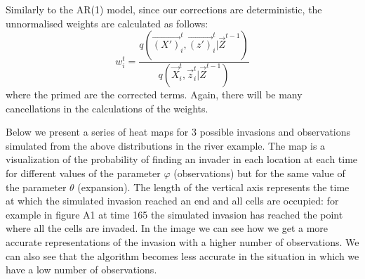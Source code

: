 Similarly to the AR(1) model, since our corrections are deterministic, the unnormalised weights are calculated as follows:
\begin{equation*}
    w^{t}_i = \frac{q(\vec{(X')}^{t}_i,\vec{(z')}^{t}_i | \vec{Z}^{t-1})}{q(\vec{X}^{t}_i,\vec{z}^{t}_i | \vec{Z}^{t-1})}
\end{equation*}
where the primed are the corrected terms. Again, there will be many cancellations in the calculations of the weights.

{\color{blue} Below we present a series of heat maps for 3 possible invasions and observations simulated from the above distributions in the river example. The map is a visualization of the probability of finding an invader in each location at each time for different values of the parameter $\varphi$ (observations) but for the same value of the parameter $\theta$ (expansion). The length of the vertical axis represents the time at which the simulated invasion reached an end and all cells are occupied: for example in figure A1 at time 165 the simulated invasion has reached the point where all the cells are invaded. In the image we can see how we get a more accurate representations of the invasion with a higher number of observations. We can also see that the algorithm becomes less accurate in the situation in which we have a low number of observations.}

